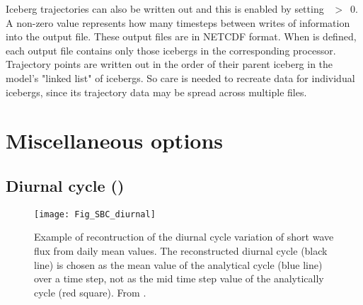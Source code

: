 \documentclass[../tex_main/NEMO_manual]{subfiles}
\begin{document}
Iceberg trajectories can also be written out and this is enabled by setting ~$>$~0.
A non-zero value represents how many timesteps between writes of information into the output file.
These output files are in NETCDF format.
When  is defined, each output file contains only those icebergs in the corresponding processor.
Trajectory points are written out in the order of their parent iceberg in the model's "linked list" of icebergs.
So care is needed to recreate data for individual icebergs, since its trajectory data may be spread across
multiple files.


\section{Miscellaneous options}
\label{sec:SBC_misc}

\subsection{Diurnal cycle (\protect{})}
\label{subsec:SBC_dcy}

\begin{figure}[!t]    \begin{center}
\texttt{[image: Fig\_SBC\_diurnal]}
\caption{ \protect\label{fig:SBC_diurnal}    
Example of recontruction of the diurnal cycle variation of short wave flux  
from daily mean values. The reconstructed diurnal cycle (black line) is chosen 
as the mean value of the analytical cycle (blue line) over a time step, not 
as the mid time step value of the analytically cycle (red square). From \citet{Bernie_al_CD07}.}
\end{center}   \end{figure}
\end{document}
